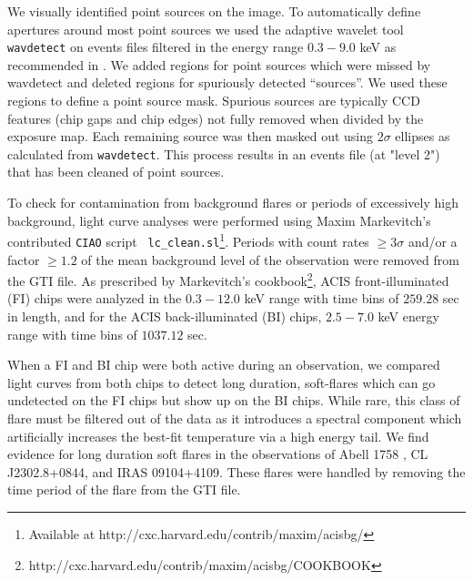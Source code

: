 \documentclass{emulateapj}
\begin{document}
We visually identified point sources on the image. To automatically
define apertures around most point sources we used the adaptive wavelet 
tool {\tt wavdetect} \citep{2002ApJS..138..185F} on events files
filtered in the energy range $0.3-9.0$ keV as recommended in
\citep{2000SPIE.4012...17J}. We added regions for point
sources which were missed by wavdetect and deleted regions for
spuriously detected ``sources''. We used these regions to define a
point source mask. Spurious sources are typically CCD features (chip
gaps and chip edges) not fully removed when divided by the exposure
map. Each remaining source was then masked out using $2\sigma$
ellipses as calculated from {\tt wavdetect}. This process results in
an events file (at "level 2") that has been cleaned of point sources.

To check for contamination from background flares or periods of
excessively high background, light curve analyses were performed using
Maxim Markevitch's contributed {\tt CIAO} script {\tt
lc\_clean.sl}\footnote{Available at
http://cxc.harvard.edu/contrib/maxim/acisbg/}. Periods with count
rates $\geq 3\sigma$ and/or a factor $\geq 1.2$ of the mean background
level of the observation were removed from the GTI file. As prescribed
by Markevitch's
cookbook\footnote{http://cxc.harvard.edu/contrib/maxim/acisbg/COOKBOOK},
ACIS front-illuminated (FI) chips were analyzed in the $0.3-12.0$ keV
range with time bins of $259.28$ sec in length, and for the ACIS
back-illuminated (BI) chips, $2.5-7.0$ keV energy range with time bins
of $1037.12$ sec.

When a FI and BI chip were both active during an observation, we
compared light curves from both chips to detect long duration,
soft-flares which can go undetected on the FI chips but show up on the
BI chips. While rare, this class of flare must be filtered out of the
data as it introduces a spectral component which artificially
increases the best-fit temperature via a high energy tail. We find
evidence for long duration soft flares in the observations of Abell
1758 \citep{2004ApJ...613..831D}, CL J2302.8+0844, and IRAS
09104+4109. These flares were handled by removing the time period of
the flare from the GTI file.
\end{document}
